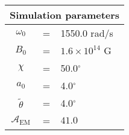 \begin{tabular}{ccl}
\multicolumn{3}{c}{Simulation parameters} \\
\hline
$\omega_0$  &=& 1550.0 rad/s\\
$B_0$  &=& ${1.6}\times 10^{14}$ G \\
$\chi$  &=& 50.0$^{\circ}$ \\
$a_0$ &=& 4.0$^{\circ}$ \\
$\tilde{\theta}$ &= & 4.0$^{\circ}$ \\
$\mathcal{A}_{\mathrm{EM}}$ &= & $41.0$
\end{tabular}
